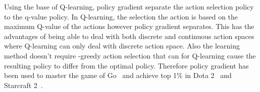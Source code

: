 Using the base of Q-learning, policy gradient separate the action selection policy to the q-value policy. In Q-learning,
the selection the action is based on the maximum Q-value of the actions however policy gradient separates. This has
the advantages of being able to deal with both discrete and continuous action spaces where Q-learning can only deal
with discrete action space. Also the learning method doesn't require \epsilon-greedy action selection that can for
Q-learning cause the resulting policy to differ from the optimal policy. Therefore policy gradient has been used to
master the game of Go~\citep{silver2017mastering} and achieve top 1\% in Dota 2~\citep{OpenAI_dota} and
Starcraft 2~\citep{starcraft2}.
